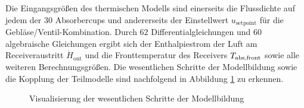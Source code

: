 Die Eingangsgrößen des thermischen Modells sind einerseits die Flussdichte auf jedem der 30 Absorbercups und andererseits der Einstellwert $u_{\mathrm{setpoint}}$ für die Gebläse/Ventil-Kombination.
Durch $62$ Differentialgleichungen und $60$ algebraische Gleichungen ergibt sich der Enthalpiestrom der Luft am Receiveraustritt $\dot{H}_{\mathrm{out}}$ und die Fronttemperatur des Receivers $T_{\mathrm{abs,front}}$ sowie alle weiteren Berechnungsgrößen.
Die wesentlichen Schritte der Modellbildung sowie die Kopplung der Teilmodelle sind nachfolgend in Abbildung \ref{fig_ZusammenfassungKopplung} zu erkennen.

\begin{figure}[p]
    \centering
    \setlength{\fboxsep}{1pt}
    \setlength{\fboxrule}{1pt}
    \caption[Visualisierung der wesentlichen Schritte der Modellbildung]{Visualisierung der wesentlichen Schritte der Modellbildung}
    \label{fig_ZusammenfassungKopplung}
\end{figure}
